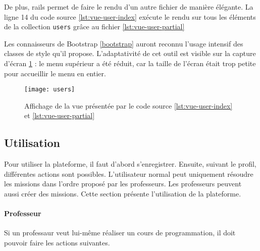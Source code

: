 \begin{figure}

\end{figure}
De plus, \gls{rails} permet de faire le rendu d'un autre fichier de manière élégante. La ligne 14 du code source \ref{lst:vue-user-index} exécute le rendu sur tous les éléments de la collection \texttt{users} grâce au fichier \ref{lst:vue-user-partial}

Les connaisseurs de Bootstrap \ref{bootstrap} auront reconnu l'usage intensif des classes de style qu'il propose. L'adaptativité de cet outil est visible sur la capture d'écran \ref{fig:vue-users} : le menu supérieur a été réduit, car la taille de l'écran était trop petite pour accueillir le menu en entier.

\begin{figure}
  \begin{center}
    \texttt{[image: users]}
    \caption{Affichage de la vue présentée par le code source \ref{lst:vue-user-index} et \ref{lst:vue-user-partial}}
    \label{fig:vue-users}
  \end{center}
\end{figure}

\subsection{Utilisation}
Pour utiliser la plateforme, il faut d'abord s'enregistrer. Ensuite, suivant le profil, différentes actions sont possibles. L'utilisateur normal peut uniquement résoudre les \glspl{mission} dans l'ordre proposé par les professeurs. Les professeurs peuvent aussi créer des \glspl{mission}. Cette section présente l'utilisation de la plateforme.

\paragraph{Professeur}
Si un professaur veut lui-même réaliser un cours de programmation, il doit pouvoir faire les actions suivantes.

